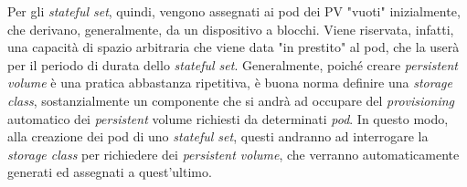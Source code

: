 Per gli \textit{stateful set}, quindi, vengono assegnati ai pod dei PV "vuoti" inizialmente, che derivano, generalmente, da un dispositivo a blocchi. Viene riservata, infatti, una capacità di spazio arbitraria che viene data "in prestito" al pod, che la userà per il periodo di durata dello \textit{stateful set}.
\newline
Generalmente, poiché creare \textit{persistent volume} è una pratica abbastanza ripetitiva, è buona norma definire una \textit{storage class}, sostanzialmente un componente che si andrà ad occupare del \textit{provisioning} automatico dei \textit{persistent} volume richiesti da determinati \textit{pod}.
\newline
In questo modo, alla creazione dei pod di uno \textit{stateful set}, questi andranno ad interrogare la \textit{storage class} per richiedere dei \textit{persistent volume}, che verranno automaticamente generati ed assegnati a quest'ultimo.
